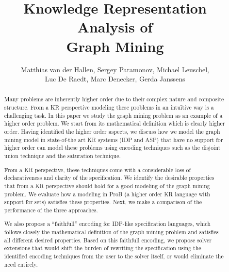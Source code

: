 \documentclass{new_tlp}
\author[]{Matthias van der Hallen, Sergey Paramonov, Michael Leuschel,\\ Luc De Raedt, Marc Denecker, Gerda Janssens}
\title{Knowledge Representation Analysis of\\ Graph Mining}
\begin{document}
\maketitle
\begin{abstract}
Many problems are inherently higher order due to their complex nature and composite structure. 
From a KR perspective modeling these problems in an intu\"itive way is a challenging task. 
In this paper we study the graph mining problem as an example of a higher order problem. 
We start from its mathematical definition which is clearly higher order. 
Having identified the higher order aspects, we discuss how we model the graph mining model 
in state-of-the art KR systems (IDP and ASP) that have no support for higher order can model these problems using encoding techniques such as the disjoint union technique and the saturation technique. 

From a KR perspective, these techniques come with a considerable loss of declarativeness and clarity of the specification. 
We identify the desirable properties that from a KR perspective should hold for a good modeling of the graph mining problem. 
We evaluate how a modeling in ProB (a higher order KR language with support for sets) satisfies these properties. 
Next, we make a comparison of the performance of the three approaches.

We also propose a “faithfull” encoding for IDP-like specification languages, which follows closely the mathematical definition of the graph mining problem and satisfies all different desired properties.
Based on this faithfull encoding,  we propose solver extensions that would shift the burden of rewriting the specification using the identified encoding techniques from the user to the solver itself, or would eliminate the need entirely.



\end{abstract}


%









\end{document}
